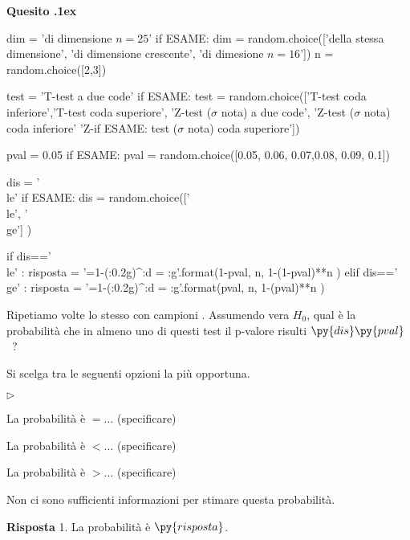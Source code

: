 \documentclass[11pt,twoside,a4paper]{article}
\newcommand{\mylabel}[1]{#1\hfill}
\renewenvironment{itemize}
  {\begin{list}{$\triangleright$}{%
   \setlength{\parskip}{0mm}
   \setlength{\topsep}{.4\baselineskip}
   \setlength{\rightmargin}{0mm}
   \setlength{\listparindent}{0mm}
   \setlength{\itemindent}{0mm}
   \setlength{\labelwidth}{2ex}
   \setlength{\itemsep}{.4\baselineskip}
   \setlength{\parsep}{0mm}
   \setlength{\partopsep}{0mm}
   \setlength{\labelsep}{1ex}
   \setlength{\leftmargin}{\labelwidth+\labelsep}
   \let\makelabel\mylabel}}{%
   \end{list}\vspace*{-1.3mm}}
\newcounter{quesito}
\newenvironment{question}{\bigskip\addtocounter{quesito}{1}\par\textbf{Quesito \thequesito.\kern1ex}}{\vspace{\parskip}}
\newenvironment{answer}{\par\textbf{Risposta\quad}}{\vspace{\parskip}}
\begin{document}
\begin{question} %
\begin{pycode}
dim = 'di dimensione $n = 25$'
if ESAME: dim  = random.choice(['della stessa dimensione', 'di dimensione crescente', 'di dimesione $n =16$'])
n = random.choice([2,3])

test = 'T-test a due code'
if ESAME: test = random.choice(['T-test coda inferiore','T-test coda superiore', 'Z-test ($\sigma$ nota) a due code', 'Z-test ($\sigma$ nota) coda inferiore' 'Z-if ESAME: test ($\sigma$ nota) coda superiore'])


pval = 0.05
if ESAME: pval = random.choice([0.05, 0.06, 0.07,0.08, 0.09, 0.1])

dis = '\\le'
if ESAME: dis = random.choice(['\\le', '\\ge'] )

if   dis=='\\le' : risposta = '=1-({:0.2g})^{:d} = {:g}'.format(1-pval, n, 1-(1-pval)**n )
elif dis=='\\ge' : risposta = '=1-({:0.2g})^{:d} = {:g}'.format(pval, n, 1-(pval)**n )
\end{pycode}
Ripetiamo  volte lo stesso  con campioni .
Assumendo vera $H_0$, qual è la probabilità che in almeno uno di questi test il p-valore risulti $\py{dis}\py{pval}$~? 

Si scelga tra le seguenti opzioni la più opportuna.
\begin{itemize}
\item[1.] La probabilità è $=\dots$ (specificare)
\item[2.] La probabilità è $<\dots$ (specificare)
\item[3.] La probabilità è $>\dots$ (specificare)
\item[4.] Non ci sono sufficienti informazioni per stimare questa probabilità.
\end{itemize}
\begin{answer}
{\color{blue}1. La probabilità è $\py{risposta}$.}
\end{answer}
\end{question}
\end{document}
